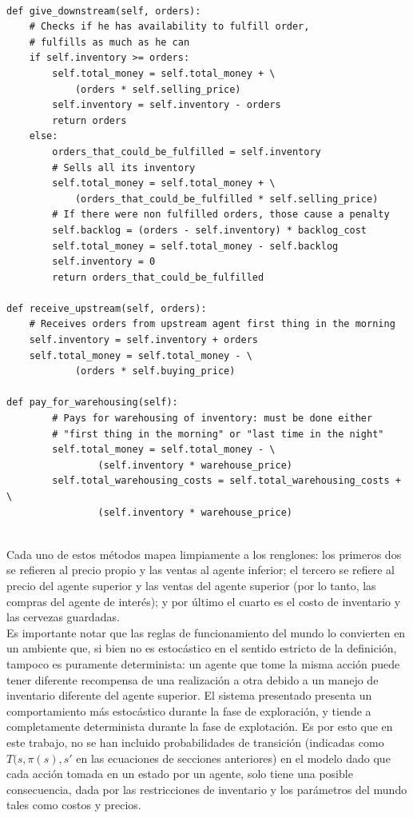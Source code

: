 \begin{verbatim}

def give_downstream(self, orders):
    # Checks if he has availability to fulfill order,
    # fulfills as much as he can
    if self.inventory >= orders:
        self.total_money = self.total_money + \
            (orders * self.selling_price)
        self.inventory = self.inventory - orders
        return orders
    else:
        orders_that_could_be_fulfilled = self.inventory
        # Sells all its inventory
        self.total_money = self.total_money + \
            (orders_that_could_be_fulfilled * self.selling_price)
        # If there were non fulfilled orders, those cause a penalty
        self.backlog = (orders - self.inventory) * backlog_cost
        self.total_money = self.total_money - self.backlog
        self.inventory = 0
        return orders_that_could_be_fulfilled

def receive_upstream(self, orders):
    # Receives orders from upstream agent first thing in the morning
    self.inventory = self.inventory + orders
    self.total_money = self.total_money - \
            (orders * self.buying_price)
     
def pay_for_warehousing(self):
        # Pays for warehousing of inventory: must be done either
        # "first thing in the morning" or "last time in the night"
        self.total_money = self.total_money - \
                (self.inventory * warehouse_price)
        self.total_warehousing_costs = self.total_warehousing_costs + \
                (self.inventory * warehouse_price)
                
\end{verbatim}

Cada uno de estos m\'etodos mapea limpiamente a los renglones: los primeros dos se refieren al precio propio y las ventas al agente inferior; el tercero se refiere al precio del agente superior y las ventas del agente superior (por lo tanto, las compras del agente de inter\'es); y por \'ultimo el cuarto es el costo de inventario y las cervezas guardadas.\\

Es importante notar que las reglas de funcionamiento del mundo lo convierten en un ambiente que, si bien no es estoc\'astico en el sentido estricto de la definici\'on, tampoco es puramente determinista: un agente que tome la misma acci\'on puede tener diferente recompensa de una realizaci\'on a otra debido a un manejo de inventario diferente del agente superior. El sistema presentado presenta un comportamiento m\'as estoc\'astico durante la fase de exploraci\'on, y tiende a completamente determinista durante la fase de explotaci\'on. Es por esto que en este trabajo, no se han incluido probabilidades de transici\'on (indicadas como $T(s, \pi(s), s'$ en las ecuaciones de secciones anteriores) en el modelo dado que cada acci\'on tomada en un estado por un agente, solo tiene una posible consecuencia, dada por las restricciones de inventario y los par\'ametros del mundo tales como costos y precios.\\

